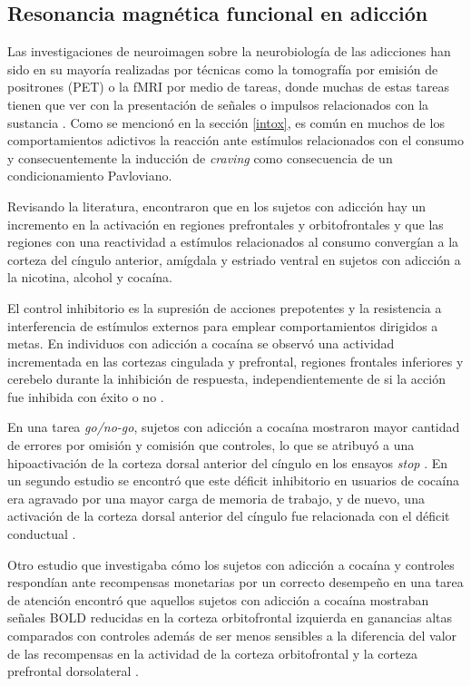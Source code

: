 \subsection{Resonancia magnética funcional en adicción}
Las investigaciones de neuroimagen sobre la neurobiología de las adicciones han sido en su mayoría realizadas por técnicas como la tomografía por emisión de positrones (PET) o la fMRI por medio de tareas, donde muchas de estas tareas tienen que ver con la presentación de señales o impulsos relacionados con la sustancia \parencite{Jasinska2014}.
Como se mencionó en la sección \ref{intox}, es común en muchos de los comportamientos adictivos la reacción ante estímulos relacionados con el consumo y consecuentemente la inducción de \textit{craving} como consecuencia de un condicionamiento Pavloviano.\par
Revisando la literatura, \textcite{Suckling2017} encontraron que en los sujetos con adicción hay un incremento en la activación en regiones prefrontales y orbitofrontales y que las regiones con una reactividad a estímulos relacionados al consumo convergían a la corteza del cíngulo anterior, amígdala y estriado ventral en sujetos con adicción a la nicotina, alcohol y cocaína. \par
El control inhibitorio es la supresión de acciones prepotentes y la resistencia a interferencia de estímulos externos para emplear comportamientos dirigidos a metas.
En individuos con adicción a cocaína se observó una actividad incrementada en las cortezas cingulada y prefrontal, regiones frontales inferiores y cerebelo durante la inhibición de respuesta, independientemente de si la acción fue inhibida con éxito o no \parencite{Suckling2017}.\par
En una tarea \textit{go/no-go}, sujetos con adicción a cocaína mostraron mayor cantidad de errores por omisión y comisión que controles, lo que se atribuyó a una hipoactivación de la corteza dorsal anterior del cíngulo en los ensayos \textit{stop} \parencite{Kaufman2003}.
En un segundo estudio se encontró que este déficit inhibitorio en usuarios de cocaína era agravado por una mayor carga de memoria de trabajo, y de nuevo, una activación de la corteza dorsal anterior del cíngulo fue relacionada con el déficit conductual \parencite{Hester2004}.\par
Otro estudio que investigaba cómo los sujetos con adicción a cocaína y controles respondían ante recompensas monetarias por un correcto desempeño en una tarea de atención encontró que aquellos sujetos con adicción a cocaína mostraban señales BOLD reducidas en la corteza orbitofrontal izquierda en ganancias altas comparados con controles además de ser menos sensibles a la diferencia del valor de las recompensas en la actividad de la corteza orbitofrontal y la corteza prefrontal dorsolateral \parencite{Goldstein2007}. \par

